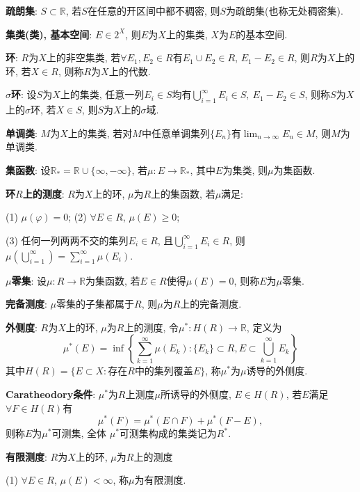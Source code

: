 \documentclass[12pt, a4paper, oneside]{ctexart}
\let\geq=\geqslant %
\def\R{\mathbb{R}}          %
\begin{document}
\textbf{疏朗集}: $S\subset \R$, 若$S$在任意的开区间中都不稠密, 则$S$为疏朗集(也称无处稠密集).

\textbf{集类(类), 基本空间}: $E\in 2^X$, 则$E$为$X$上的集类, $X$为$E$的基本空间.

\textbf{环}: $R$为$X$上的非空集类, 若$\forall E_1, E_2\in R$有$E_1\cup E_2\in R$, $E_1-E_2\in R$, 则$R$为$X$上的环, 若$X\in R$, 则称$R$为$X$上的代数.

\textbf{$\sigma$环}: 设$S$为$X$上的集类, 任意一列$E_i\in S$均有$\bigcup_{i=1}^\infty E_i\in S,\ E_1-E_2\in S$, 则称$S$为$X$上的$\sigma$环, 若$X\in S$, 则$S$为$X$上的$\sigma$域.

\textbf{单调类}: $M$为$X$上的集类, 若对$M$中任意单调集列$\{E_n\}$有$\lim_{n\to\infty}E_n\in M$, 则$M$为单调类.

\textbf{集函数}: 设$\R_* = \R\cup\{\infty, -\infty\}$, 若$\mu:E\to\R_*$, 其中$E$为集类, 则$\mu$为集函数.

\textbf{环$R$上的测度}: $R$为$X$上的环, $\mu$为$R$上的集函数, 若$\mu$满足:

(1) $\mu(\varphi) = 0$; (2) $\forall E\in R$, $\mu(E)\geq 0$;

(3) 任何一列两两不交的集列$E_i\in R$, 且$\bigcup_{i=1}^\infty E_i\in R$, 则$\mu\left(\bigcup_{i=1}^\infty\right) = \sum_{i=1}^\infty\mu(E_i)$.

\textbf{$\mu$零集}: 设$\mu:R\to \R$为集函数, 若$E\in R$使得$\mu(E) = 0$, 则称$E$为$\mu$零集.

\textbf{完备测度}: $\mu$零集的子集都属于$R$, 则$\mu$为$R$上的完备测度.

\textbf{外侧度}: $R$为$X$上的环, $\mu$为$R$上的测度, 令$\mu^*:H(R)\to\R$, 定义为
\begin{equation*}
    \mu^*(E) = \inf\left\{\sum_{k=1}^\infty \mu(E_k):\{E_k\}\subset R, E\subset \bigcup_{k=1}^\infty E_k\right\}
\end{equation*}
其中$H(R) = \{E\subset X: \text{存在}R\text{中的集列覆盖}E\}$, 称$\mu^*$为$\mu$诱导的外侧度.

\textbf{Caratheodory条件}: $\mu^*$为$R$上测度$\mu$所诱导的外侧度, $E\in H(R)$, 若$E$满足$\forall F\in H(R)$有 
\begin{equation*}
\mu^*(F) = \mu^*(E\cap F) +\mu^*(F-E),
\end{equation*}
则称$E$为$\mu^*$可测集, 全体 $\mu^*$可测集构成的集类记为$R^*$.

\textbf{有限测度}: $R$为$X$上的环, $\mu$为$R$上的测度

(1) $\forall E\in R$, $\mu(E) < \infty$, 称$\mu$为有限测度.
\end{document}
